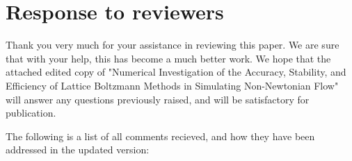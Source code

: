 \documentclass[a4paper,10pt]{article}
\begin{document}
	
\section{Response to reviewers}

Thank you very much for your assistance in reviewing this paper. We are sure that with your help, this has become a much better work. We hope that the attached edited copy of "Numerical Investigation of the Accuracy, Stability, and Efficiency of Lattice Boltzmann Methods in Simulating Non-Newtonian Flow" will answer any questions previously raised, and will be satisfactory for publication.

The following is a list of all comments recieved, and how they have been addressed in the updated version:
\end{document}
